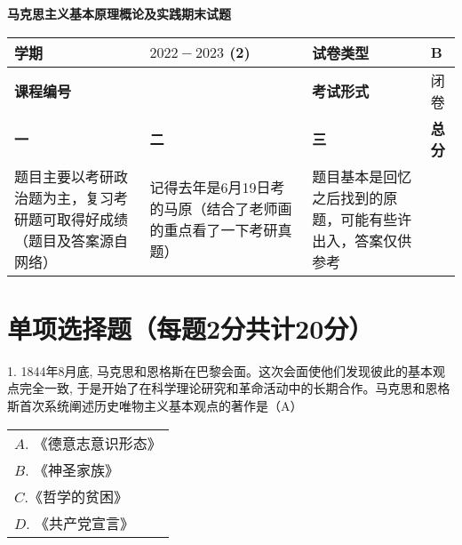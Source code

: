 \documentclass[a4paper,12pt]{article}
\begin{document}
\renewcommand{\arraystretch}{1.5}
\begin{center}
     \textbf{马克思主义基本原理概论及实践期末试题}\\[0.5cm]
    \begin{tabularx}{\textwidth}{|>{\centering\arraybackslash}X|>{\centering\arraybackslash}X|>{\centering\arraybackslash}X|>{\centering\arraybackslash}X|}
        \hline
        \textbf{学期} & $2022-2023$ (2) & \textbf{试卷类型} & B \\
        \hline
        \textbf{课程编号} &16402002 & \textbf{考试形式} &闭卷 \\
        \hline
        \textbf{一} &  \textbf{二}& \textbf{三} &  \textbf{总分}\\
        \hline
        题目主要以考研政治题为主，复习考研题可取得好成绩（题目及答案源自网络） & 记得去年是6月19日考的马原（结合了老师画的重点看了一下考研真题）& 题目基本是回忆之后找到的原题，可能有些许出入，答案仅供参考 & \\
        \hline
    \end{tabularx}
\end{center}




\section{单项选择题（每题2分共计20分）}



1. 1844年8月底, 马克思和恩格斯在巴黎会面。这次会面使他们发现彼此的基本观点完全一致, 于是开始了在科学理论研究和革命活动中的长期合作。马克思和恩格斯首次系统阐述历史唯物主义基本观点的著作是（A）




\noindent\begin{tabular}{l}
$ A $. 《德意志意识形态》 \\
$ B $. 《神圣家族》 \\
$ C $.《哲学的贫困》 \\
$ D $. 《共产党宣言》 \\
\end{tabular}
\end{document}

